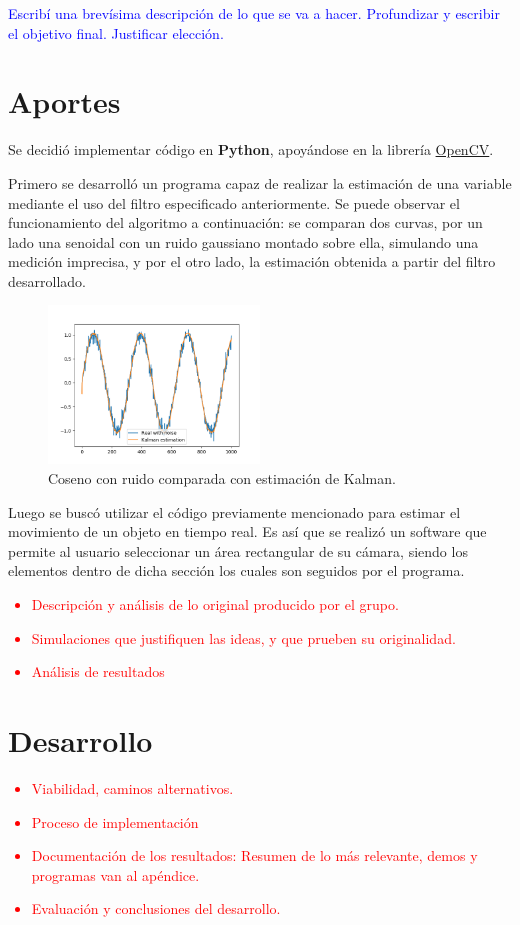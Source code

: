 \textcolor{blue}{Escribí una brevísima descripción de lo que se va a hacer. Profundizar y escribir el objetivo final. Justificar elección.}

\section{Aportes}
Se decidió implementar código en \textbf{Python}, apoyándose en la librería \href{https://opencv.org/}{OpenCV}.

Primero se desarrolló un programa capaz de realizar la estimación de una variable mediante el uso del filtro especificado anteriormente. Se puede observar el funcionamiento del algoritmo a continuación: se comparan dos curvas, por un lado una senoidal con un ruido gaussiano montado sobre ella, simulando una medición imprecisa, y por el otro lado, la estimación obtenida a partir del filtro desarrollado.
\begin{figure}[H]
\centering
	\includegraphics[width=0.5\textwidth]{Imagenes/Kalman_test_1.png}
	\caption{Coseno con ruido comparada con estimación de Kalman.}
	\label{fig:kalman-comp}
\end{figure}

Luego se buscó utilizar el código previamente mencionado para estimar el movimiento de un objeto en tiempo real. Es así que se realizó un software que permite al usuario seleccionar un área rectangular de su cámara, siendo los elementos dentro de dicha sección los cuales son seguidos por el programa.

\textcolor{red}{
\begin{itemize}
	\item Descripción y análisis de lo original producido por el grupo.
	\item Simulaciones que justifiquen las ideas, y que prueben su originalidad.
	\item Análisis de resultados
\end{itemize}
}

\section{Desarrollo}
\textcolor{red}{
\begin{itemize}
	\item Viabilidad, caminos alternativos.
	\item Proceso de implementación
	\item Documentación de los resultados: Resumen de lo más relevante, demos y programas van al apéndice.
	\item Evaluación y conclusiones del desarrollo.
\end{itemize}
}

